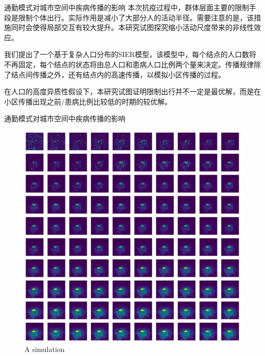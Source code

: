 \begin{frame}{通勤模式对城市空间中疾病传播的影响}
    本次抗疫过程中，群体层面主要的限制手段是限制个体出行。实际作用是减小了大部分人的活动半径。需要注意的是，该措施同时会使得局部交互有较大提升。本研究试图探究缩小活动尺度带来的非线性效应。
    
    \vspace{0.5cm}
    
    我们提出了一个基于复杂人口分布的SIER模型，该模型中，每个结点的人口数将不再固定，每个结点的状态将由总人口和患病人口比例两个量来决定。传播规律除了结点间传播之外，还有结点内的高速传播，以模拟小区传播的过程。
    
    \vspace{0.5cm}
    
    在人口的高度异质性假设下，本研究试图证明限制出行并不一定是最优解，而是在小区传播出现之前/患病比例比较低的时期的较优解。%
\end{frame}
\begin{frame}{通勤模式对城市空间中疾病传播的影响}
    \begin{figure}
        \centering
        \includegraphics[width = 0.8\linewidth]{pics/simu.png}
        \caption{A simulation}
    \end{figure}
\end{frame}